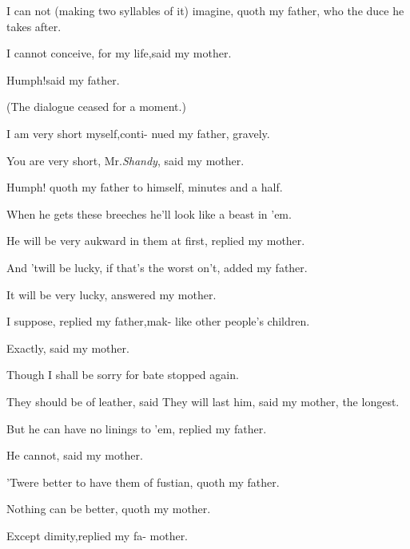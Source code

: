 \documentclass[twoside]{article}
\begin{document}
\tsh I can not (making two syllables\break
of it) imagine, quoth my father, who\break
the duce he takes after.\tsh

I cannot conceive, for my life,\tsk said\break 
my mother.\tsh

\eject

Humph!\tsh\topstrut said my father.

(The dialogue ceased for a moment.)

\tsh I am very short myself,\tsk conti-\break 
nued my father, gravely.

You are very short, Mr.\@ \textit{Shandy},\tsk\break
said my mother.

Humph! quoth my father to himself,\break
{} 
minutes and a half.

\tsh When he gets these breeches\break
{} 
he’ll look like a beast in ’em.

\eject

\topstrut He will be very aukward in them at\break
first, replied my mother.\tsh

\tsh And ’twill be lucky, if that’s\break
the worst on’t, added my father.

It will be very lucky, answered my\break
mother.

I suppose, replied my father,\tsk mak-\break 
{} 
like other people’s children.\tsh

Exactly, said my mother.\tsh

\tsh Though I shall be sorry for\break
{}
bate stopped again.

\tsh They should be of leather, said\break
{}
They will last him, said my mother, the\break
longest.

But he can have no linings to ’em,\break
replied my father.\tsh

He cannot, said my mother.

’Twere better to have them of fustian,\break
quoth my father.

Nothing can be better, quoth my\break
mother.\tsh

\tsh Except dimity,\tsk replied my fa-\break 
{}
mother.
\end{document}
